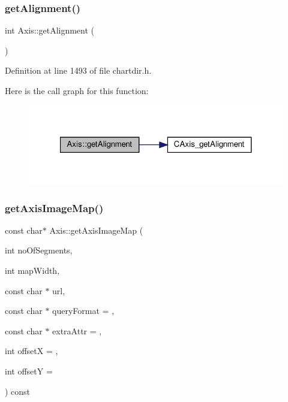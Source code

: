 \subsubsection{\texorpdfstring{get\+Alignment()}{getAlignment()}}
{\footnotesize\ttfamily int Axis\+::get\+Alignment (\begin{DoxyParamCaption}{ }\end{DoxyParamCaption})\hspace{0.3cm}{\ttfamily [inline]}}



Definition at line 1493 of file chartdir.\+h.

Here is the call graph for this function\+:
\nopagebreak
\begin{figure}[H]
\begin{center}
\leavevmode
\includegraphics[width=321pt]{class_axis_a7e8e4de986cb83b59d23f0d9ed66deaf_cgraph}
\end{center}
\end{figure}
\mbox{\label{class_axis_a27273baa6bef81839474b96f3560e003}} 
\subsubsection{\texorpdfstring{get\+Axis\+Image\+Map()}{getAxisImageMap()}}
{\footnotesize\ttfamily const char$\ast$ Axis\+::get\+Axis\+Image\+Map (\begin{DoxyParamCaption}\item[{int}]{no\+Of\+Segments,  }\item[{int}]{map\+Width,  }\item[{const char $\ast$}]{url,  }\item[{const char $\ast$}]{query\+Format = {},  }\item[{const char $\ast$}]{extra\+Attr = {},  }\item[{int}]{offsetX = {},  }\item[{int}]{offsetY = {} }\end{DoxyParamCaption}) const\hspace{0.3cm}{\ttfamily [inline]}}



